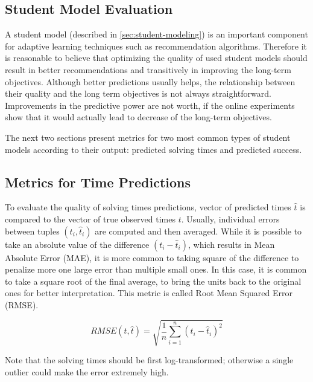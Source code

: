 \subsection{Student Model Evaluation}
\label{sec:student-model-evaluation}

A student model (described in \ref{sec:student-modeling})
  is an important component for adaptive learning techniques
  such as recommendation algorithms.
Therefore it is reasonable to believe that optimizing the quality
  of used student models should result in better recommendations
  and transitively in improving the long-term objectives.
Although better predictions usually helps,
  the relationship between their quality and the long term objectives
  is not always straightforward.
Improvements in the predictive power are not worth,
  if the online experiments show that it  would actually
  lead to decrease of the long-term objectives.

The next two sections present metrics for two most common
  types of student models according to their output:
  predicted solving times and predicted success.

\subsection{Metrics for Time Predictions}
\label{sec:metrics-for-time-predictions}

To evaluate the quality of solving times predictions,
  vector of predicted times $\hat{t}$ is compared to
  the vector of true observed times $t$.
Usually, individual errors between tuples $(t_i, \hat{t}_i)$ are computed
  and then averaged.
While it is possible to take an absolute value of the
  difference $(t_i - \hat{t}_i)$,
  which results in Mean Absolute Error (MAE),
it is more common to taking square of the difference
  to penalize more one large error than multiple small ones.
In this case, it is common to take a square root of the final
  average, to bring the units back to the original ones
  for better interpretation.
This metric is called Root Mean Squared Error (RMSE).

$$
RMSE(t, \hat{t}) = \sqrt{\frac{1}{n} \sum_{i=1}^n (t_i - \hat{t}_i)^2}
$$

Note that the solving times should be first log-transformed;
  otherwise a single outlier could make the error extremely high.


